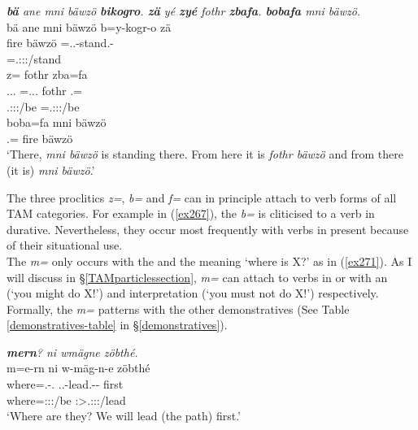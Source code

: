 \begin{exe}
	\ex \emph{\textbf{bä} ane mni bäwzö \textbf{bikogro}. \textbf{zä} yé \textbf{zyé} fothr \textbf{zbafa}. \textbf{bobafa} mni bäwzö.}\\
	\glll bä ane mni bäwzö b=y-kogr-o zä\\
	\Med{} \Dem{} fire bäwzö \Med=\Tsg.\Masc.\Alph-stand.\Ndu-\Andat{} \Prox{}\\
	{} {} {} {} \footnotesize{\Med=\Tsg.\Masc:\Sbj:\Nonpast:\Ipfv/stand} {}\\
	\sn
	\glll {} z= fothr zba=fa\\
	\Tsg.\Masc.\Cop.\Ndu{} \Prox=\Tsg.\Masc.\Cop.\Ndu{} fothr \Prox.\Abl=\Abl{}\\
	\footnotesize{\Tsg.\Masc:\Sbj:\Nonpast:\Ipfv/be} \footnotesize{\Prox=\Tsg.\Masc:\Sbj:\Nonpast:\Ipfv/be} {} {} {} {} {} {}\\
	\sn
	\gll boba=fa mni bäwzö\\
	\Med.\Abl=\Abl{} fire bäwzö\\
	\trans `There, \emph{mni bäwzö} is standing there. From here it is \emph{fothr bäwzö} and from there (it is) \emph{mni bäwzö}.'
	\label{ex272}
\end{exe}

The three proclitics \emph{z=}, \emph{b=} and \emph{f=} can in principle attach to verb forms of all TAM categories. For example in (\ref{ex267}), the  \emph{b=} is cliticised to a verb in  durative. Nevertheless, they occur most frequently with verbs in present  because of their situational use.\\

The  \emph{m=} only occurs with the  and the meaning `where is X?' as in (\ref{ex271}). As I will discuss in \S{}\ref{TAMparticlessection}, \emph{m=} can attach to verbs in  or   with an  (`you might do X!') and  interpretation (`you must not do X!') respectively. Formally, the \emph{m=}  patterns with the other demonstratives (See Table \ref{demonstratives-table} in \S{}\ref{demonstratives}).

\begin{exe}
	\ex \emph{\textbf{mern}? ni wmägne zöbthé.}\\
	\glll m=e-rn ni w-mäg-n-e zöbthé\\
	where=\Stnsg.\Alph-\Cop.\Du{} \Fnsg{} \Tsg.\F.\Alph-lead.\Ext-\Du-\Fnsg{} first\\
	\footnotesize{where=\Stdu:\Sbj:\Nonpast:\Ipfv/be} {} \footnotesize{\Fdu:\Sbj>\Tsg.\F:\Obj:\Nonpast:\Ipfv/lead} {}\\
	\trans `Where are they? We will lead (the path) first.'
	\label{ex271}
\end{exe}